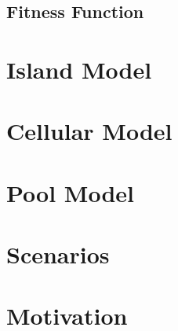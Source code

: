 \documentclass{article}
\begin{document}
\subsection{Fitness Function}\label{subsection: fitness function}


\section{Island Model}\label{section: island model}


\section{Cellular Model}\label{section: cellular model}


\section{Pool Model}\label{section: pool model}


\section{Scenarios}\label{section: scenarios}


\section{Motivation}\label{section: motivation}
\end{document}
